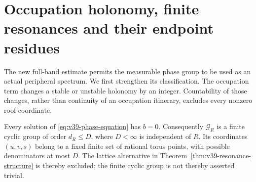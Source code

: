\section{Occupation holonomy, finite resonances and their endpoint residues}
\label{sec:v40-holonomy-residues}
The new full-band estimate permits the measurable phase group to be
used as an actual peripheral spectrum. We first strengthen its
classification. The occupation term changes a stable or unstable
holonomy by an integer. Countability of those changes, rather than
continuity of an occupation itinerary, excludes every nonzero roof
coordinate.

\begin{theorem}
\label{thm:v40-no-roof-resonance}
Every solution of \eqref{eq:v39-phase-equation} has $b=0$.
Consequently $\mathcal G_R$ is a finite cyclic group of order
$d_R\le D$, where $D<\infty$ is independent of $R$. Its coordinates
$(u,v,s)$ belong to a fixed finite set of rational torus points, with
possible denominators at most $D$. The lattice alternative in
Theorem~\ref{thm:v39-resonance-structure} is thereby excluded; the
finite cyclic group is not thereby asserted trivial.
\end{theorem}
